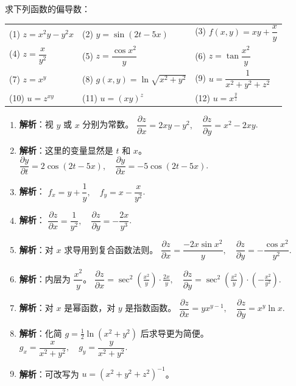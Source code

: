 \documentclass[lang=cn,11pt]{elegantbook}
\begin{document}
\begin{exercise}[偏导数的计算]
求下列函数的偏导数：\\
\begin{tabular}{p{}p{}p{}}
(1) $z = x^2y - y^2x$ & (2) $y = \sin(2t - 5x)$ & (3) $f(x,y) = xy + \dfrac{x}{y}$ \\
(4) $z = \dfrac{x}{y^2}$ & (5) $z = \dfrac{\cos x^2}{y}$ & (6) $z = \tan\dfrac{x^2}{y}$ \\
(7) $z = x^y$ & (8) $g(x,y) = \ln\sqrt{x^2+y^2}$ & (9) $u = \dfrac{1}{x^2+y^2+z^2}$ \\
(10) $u = z^{xy}$ & (11) $u = (xy)^z$ & (12) $u = x^{\frac{y}{z}}$
\end{tabular}
\end{exercise}
\begin{solution}
\begin{enumerate}
  \item[(1)] \textbf{解析}：视 $y$ 或 $x$ 分别为常数。
  $\dfrac{\partial z}{\partial x} = 2xy - y^2, \quad \dfrac{\partial z}{\partial y} = x^2 - 2xy$.
  \item[(2)] \textbf{解析}：这里的变量显然是 $t$ 和 $x$。
  $\dfrac{\partial y}{\partial t} = 2\cos(2t - 5x), \quad \dfrac{\partial y}{\partial x} = -5\cos(2t - 5x)$.
  \item[(3)] \textbf{解析}：
  $f_x = y + \dfrac{1}{y}, \quad f_y = x - \dfrac{x}{y^2}$.
  \item[(4)] \textbf{解析}：
  $\dfrac{\partial z}{\partial x} = \dfrac{1}{y^2}, \quad \dfrac{\partial z}{\partial y} = -\dfrac{2x}{y^3}$.
  \item[(5)] \textbf{解析}：对 $x$ 求导用到复合函数法则。
  $\dfrac{\partial z}{\partial x} = \dfrac{-2x\sin x^2}{y}, \quad \dfrac{\partial z}{\partial y} = -\dfrac{\cos x^2}{y^2}$.
  \item[(6)] \textbf{解析}：内层为 $\dfrac{x^2}{y}$。
  $\dfrac{\partial z}{\partial x} = \sec^2\left(\frac{x^2}{y}\right) \cdot \frac{2x}{y}, \quad \dfrac{\partial z}{\partial y} = \sec^2\left(\frac{x^2}{y}\right) \cdot \left(-\frac{x^2}{y^2}\right)$.
  \item[(7)] \textbf{解析}：对 $x$ 是幂函数，对 $y$ 是指数函数。
  $\dfrac{\partial z}{\partial x} = yx^{y-1}, \quad \dfrac{\partial z}{\partial y} = x^y\ln x$.
  \item[(8)] \textbf{解析}：化简 $g = \frac{1}{2}\ln(x^2+y^2)$ 后求导更为简便。
  $g_x = \dfrac{x}{x^2+y^2}, \quad g_y = \dfrac{y}{x^2+y^2}$.
  \item[(9)] \textbf{解析}：可改写为 $u = (x^2+y^2+z^2)^{-1}$。

\end{enumerate}
\end{solution}
\end{document}
